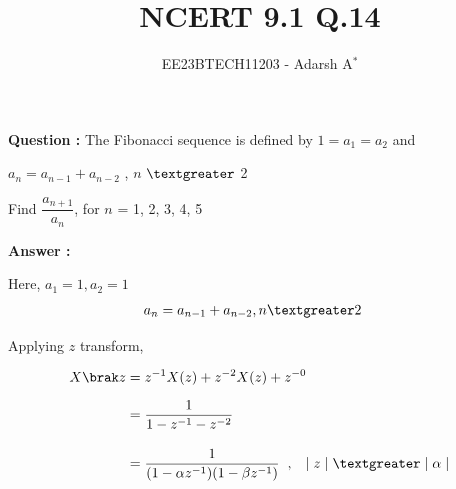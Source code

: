 \documentclass[journal,12pt,twocolumn]{IEEEtran}
\theoremstyle{remark}
\begin{document}
	
	
	\vspace{3cm}
	
	\title{NCERT 9.1 Q.14}
	\author{EE23BTECH11203 - Adarsh A$^{*}$%
	}
	\maketitle
	\bigskip
	
	\renewcommand{\thefigure}{\theenumi}
	\renewcommand{\thetable}{\theenumi}
	
	
	\vspace{0.2cm}
	\linespread{1.1}
	
	
	\textbf{Question : }
	The Fibonacci sequence is defined by $1 = a_1 = a_2$ and \par $a_n = a_{n-1} + a_{n-2}$ , $n$ $\textgreater$ 2
	
	\vspace{0.2cm}
	Find $\dfrac{a_{n + 1}}{a_n}$, for $n$ = 1, 2, 3, 4, 5
	
	\vspace{0.3cm}
	\textbf{Answer : }
	\vspace{0.3cm}
	\fi
	
	
	\vspace{-0.2cm}
	
	Here, $a_1 = 1, a_2 = 1$
	\begin{align}
	a_n &= a_{n-1} + a_{n-2} , n \textgreater 2
	\end{align}
	\vspace{0.2cm}
	
	Applying $z$ transform,
	
	\vspace{-0.8cm}
	
	\begin{align}
		X\brak z	&= z^{-1} X(z) + z^{-2} X(z) + z^{-0}  \\[6pt]
		&= \dfrac{1}{1 - z^{-1} - z^{-2}}  \\[10pt]
		&= \dfrac{1}{(1 - \alpha z^{-1})(1 - \beta z^{-1})} \hspace{0.2cm}, \hspace{0.3cm}\lvert \hspace{0.1cm} z \hspace{0.1cm}\rvert \hspace{0.1cm} \textgreater \hspace{0.1cm} \lvert \hspace{0.1cm} \alpha \hspace{0.1cm} \rvert 				
	\end{align}
	
\end{document}
